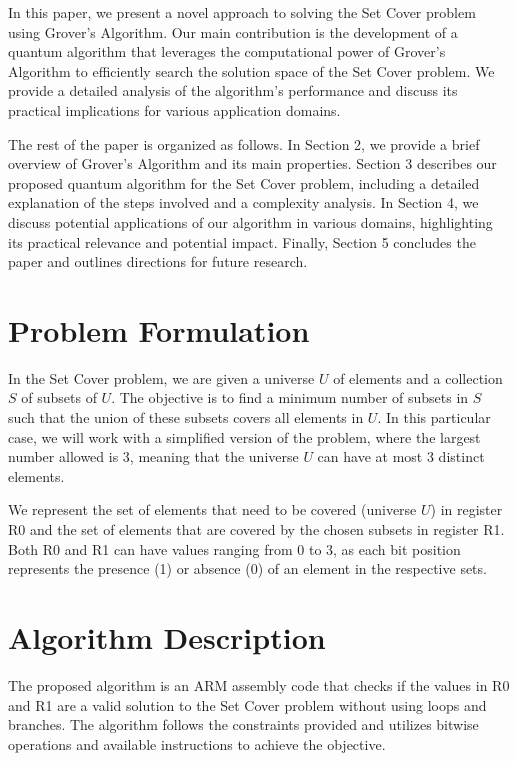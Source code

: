 In this paper, we present a novel approach to solving the Set Cover problem using Grover's Algorithm. Our main contribution is the development of a quantum algorithm that leverages the computational power of Grover's Algorithm to efficiently search the solution space of the Set Cover problem. We provide a detailed analysis of the algorithm's performance and discuss its practical implications for various application domains.

The rest of the paper is organized as follows. In Section 2, we provide a brief overview of Grover's Algorithm and its main properties. Section 3 describes our proposed quantum algorithm for the Set Cover problem, including a detailed explanation of the steps involved and a complexity analysis. In Section 4, we discuss potential applications of our algorithm in various domains, highlighting its practical relevance and potential impact. Finally, Section 5 concludes the paper and outlines directions for future research.


\section{Problem Formulation}
In the Set Cover problem, we are given a universe $U$ of elements and a collection $S$ of subsets of $U$. The objective is to find a minimum number of subsets in $S$ such that the union of these subsets covers all elements in $U$. In this particular case, we will work with a simplified version of the problem, where the largest number allowed is 3, meaning that the universe $U$ can have at most 3 distinct elements.

We represent the set of elements that need to be covered (universe $U$) in register R0 and the set of elements that are covered by the chosen subsets in register R1. Both R0 and R1 can have values ranging from 0 to 3, as each bit position represents the presence (1) or absence (0) of an element in the respective sets.

\section{Algorithm Description}
The proposed algorithm is an ARM assembly code that checks if the values in R0 and R1 are a valid solution to the Set Cover problem without using loops and branches. The algorithm follows the constraints provided and utilizes bitwise operations and available instructions to achieve the objective.

